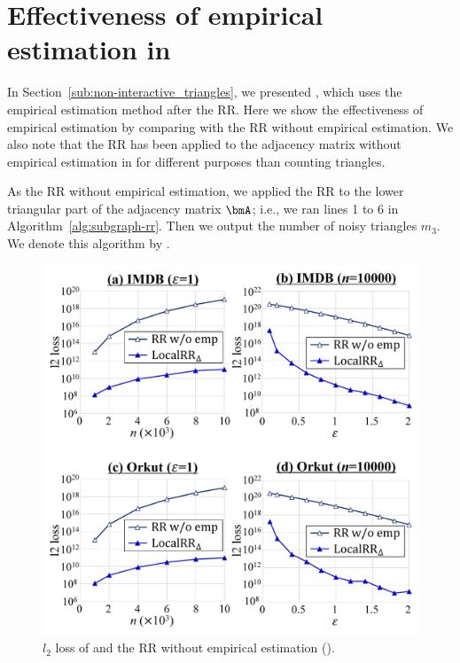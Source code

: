 \appendix


\section{Effectiveness of empirical estimation in }
\label{sec:RR_emp}
In Section~\ref{sub:non-interactive_triangles}, we presented , which uses the empirical estimation method after the RR. 
Here we show the effectiveness of empirical estimation by comparing  with the RR without empirical estimation. 
We also note that the RR has been applied to the adjacency matrix without empirical estimation in \cite{Qin_CCS17,Ye_ICDE20} for different purposes than counting triangles. 

As the RR without empirical estimation, we applied the RR to the lower triangular part of the adjacency matrix $\bmA$; i.e., we ran lines 1 to 6 in Algorithm~\ref{alg:subgraph-rr}. 
Then we output the number of noisy triangles $m_3$. 
We denote this algorithm by . 

\begin{figure}[t]
\centering
\includegraphics[width=0.99\linewidth]{fig/res5_RR_wo_emp.pdf}
\vspace{-2mm}
\caption{$l_2$ loss of  and the RR without empirical estimation ().}
\label{fig:res5_RR_wo_emp}
\end{figure}

